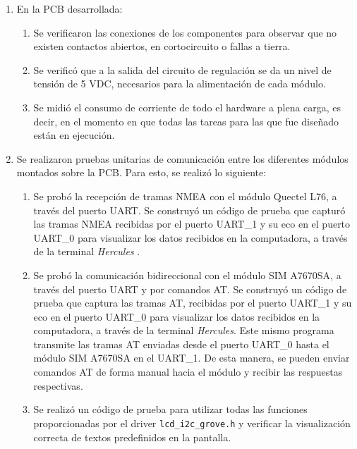 \begin{enumerate}
\item En la PCB desarrollada:
	\begin{enumerate}
	\item Se verificaron las conexiones de los componentes para observar que no existen contactos abiertos, en cortocircuito o fallas a tierra.
	\item Se verificó que a la salida del circuito de regulación se da un nivel de tensión de 5 VDC, necesarios para la alimentación de cada módulo.
	\item Se midió el consumo de corriente de todo el hardware a plena carga, es decir, en el momento en que todas las tareas para las que fue diseñado están en ejecución. 
	\end{enumerate}

\item Se realizaron pruebas unitarias de comunicación entre los diferentes módulos montados sobre la PCB. Para esto, se realizó lo siguiente: 

	\begin{enumerate}
	
	\item  Se probó la recepción de tramas NMEA con el módulo Quectel L76, a través del puerto UART. Se construyó un código de prueba que capturó las tramas NMEA recibidas por el puerto UART\_1 y su eco en el puerto UART\_0 para visualizar los datos recibidos en la computadora, a través de la terminal \textit{Hercules} \citep{hercules}. 
	
	\item Se probó la comunicación bidireccional con el módulo SIM A7670SA, a través del puerto UART y por comandos AT. Se construyó un código de prueba que captura las tramas AT, recibidas por el puerto UART\_1 y su eco en el puerto UART\_0 para visualizar los datos recibidos en la computadora, a través de la terminal \textit{Hercules}. Este mismo programa transmite las tramas AT enviadas desde el puerto UART\_0 hasta el módulo SIM A7670SA en el UART\_1. De esta manera, se pueden enviar comandos AT de forma manual hacia el módulo y recibir las respuestas respectivas. 
	
	\item Se realizó un código de prueba para utilizar todas las funciones proporcionadas por el driver \verb|lcd_i2c_grove.h| y verificar la visualización correcta de textos predefinidos en la pantalla. 
	
	\end{enumerate}
	
\end{enumerate}


